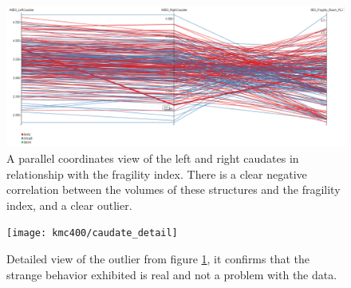 \begin{figure}
	\centering
		\includegraphics[width=\textwidth]{figures/kmc400/caudate_parallel}
	\caption{A parallel coordinates view of the left and right caudates in relationship with the fragility index. There is a clear negative correlation between the volumes of these structures and the fragility index, and a clear outlier.}
	\label{fig_caudate_parallel}
\end{figure}


\begin{figure}
	\centering
		\texttt{[image: kmc400/caudate\_detail]}
	\caption{Detailed view of the outlier from figure \ref{fig_caudate_parallel}, it confirms that the strange behavior exhibited is real and not a problem with the data.}
	\label{fig_asymetric_caudate_detail}
\end{figure}


 





